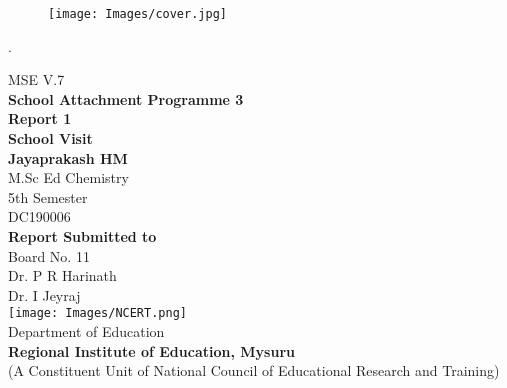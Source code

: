 \begin{figure}[H]
    \centering
    \texttt{[image: Images/cover.jpg]}
\end{figure}
\newpage
.
\newpage
{}
\begin{titlepage}
\begin{center}
{\large MSE V.7\\}%
\vfill
 {\Huge\bfseries School Attachment Programme 3} \\ 
 \vspace{15pt}
  {\Huge\bfseries Report 1 \\ School Visit\\}
 \vspace{3cm}
 {\Large\bfseries Jayaprakash HM}\\[5pt]
 M.Sc Ed Chemistry\\ 5th Semester\\ DC190006\\[14pt]
 \vspace{1cm}
{\large\textbf{Report Submitted to}} \\[5pt]
{{Board No. 11 \\ Dr. P R Harinath\\Dr. I Jeyraj\\}}
 \vfill
\texttt{[image: Images/NCERT.png]}\\\vspace{10pt}
{Department of Education}\\[5pt]
{\textbf{Regional Institute of Education, Mysuru}}\\[5pt]
{(A Constituent Unit of National Council of Educational Research and Training)}\\
\end{center}
\end{titlepage}